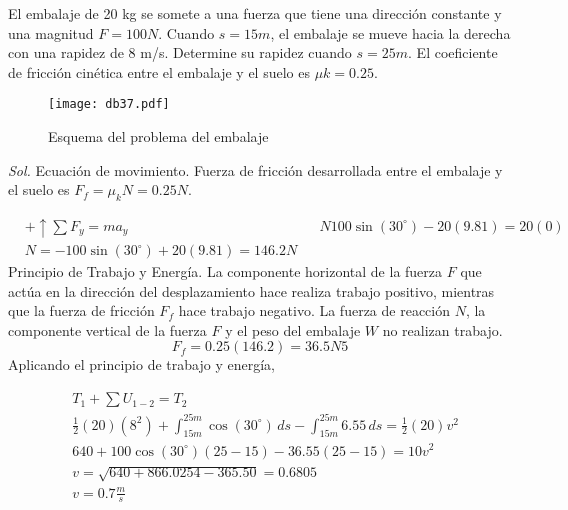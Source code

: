 \begin{example}
    El embalaje de 20 kg se somete a una fuerza que tiene una dirección constante y una magnitud $F = 100 N$. Cuando $s= 15 m$, el embalaje se mueve hacia la derecha con una rapidez de 8 m/s. Determine su rapidez cuando $s = 25 m$. El coeficiente de fricción cinética entre el embalaje y el suelo es $\mu k = 0.25$.
\end{example}
\begin{figure}[h!]
\centering
  \texttt{[image: db37.pdf]}
  \caption{Esquema del problema del embalaje}
  \label{db37}
\end{figure}
\textit{ Sol. }
Ecuación de movimiento. Fuerza de fricción desarrollada entre el embalaje y el suelo es $F_f= \mu_k N= 0.25N$.

\begin{align*}
    &+\uparrow \sum F_y = ma_y&& N 100\sin{(30^{\circ})} - 20(9.81) = 20(0)\\
    &N =- 100\sin{(30^{\circ})} +20(9.81) = 146.2N
\end{align*}
Principio de Trabajo y Energía. La componente horizontal de la fuerza $F$ que actúa en la dirección del desplazamiento hace realiza trabajo positivo, mientras que la fuerza de fricción $F_f$ hace trabajo negativo. La fuerza de reacción $N$, la componente vertical de la fuerza $F$ y el peso del embalaje $W$ no realizan trabajo.
\begin{equation*}
    F_f = 0.25(146.2) = 36.5N5
\end{equation*}
Aplicando el principio de trabajo y energía,

\begin{align*}
    &T_1 +\sum U_{1 - 2} = T_2\\
    &\frac{1}{2}(20)(8^2) +\int_{15m}^{25m} \cos{(30^{\circ})}\,ds -\int_{15m}^{25m} 6.55\, ds = \frac{1}{2}(20)v^2\\
    &640 + 100\cos{(30^{\circ})}\left(25 - 15\right) - 36.55(25 -15) = 10v^2\\
    &v = \sqrt{640 + 866.0254 - 365.50} = 0.6805\\
    &v = 0.7\frac{m}{s}
\end{align*}

